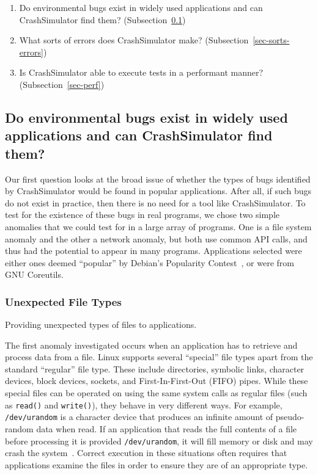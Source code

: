 \begin{enumerate}

\item{Do environmental bugs exist in widely used applications and can
      CrashSimulator find them? (Subsection~\ref{sec-env-bugs})}

\item{What sorts of errors does CrashSimulator make?
      (Subsection~\ref{sec-sorts-errors})} 

\item{Is CrashSimulator able to
      execute tests in a performant manner? (Subsection~\ref{sec-perf})}

\end{enumerate}


\subsection{Do environmental bugs  exist in widely used applications and
can CrashSimulator find them?} \label{sec-env-bugs}

Our first question looks at the broad issue of whether the types of bugs
identified by CrashSimulator would be found in popular applications.  After
all, if such bugs do not exist in practice, then there is no need for a
tool like CrashSimulator.  To test for the existence of these bugs in real
programs, we chose two simple anomalies that we could test for in a large
array of programs.  One is a file system anomaly and the other a network
anomaly, but both use common API calls, and thus had the potential to
appear in many programs.  Applications selected were either ones deemed
``popular'' by Debian's Popularity Contest~\cite{DebPopCon}, or were from
GNU Coreutils.

\subsubsection{Unexpected File Types}
\label{sec-file-type-bugs}
Providing unexpected types of files to
applications.

The first anomaly investigated occurs when an application has to retrieve
and process data from a file.  Linux supports several ``special'' file
types apart from the standard ``regular'' file type.  These include
directories, symbolic links, character devices, block devices, sockets, and
First-In-First-Out (FIFO) pipes.  While these special files can be operated
on using the same system calls as regular files (such as {\tt read()} and
{\tt write()}), they behave in very different ways.  For example, {\tt
/dev/urandom} is a character device that produces an infinite amount of
pseudo-random data when read.  If an application that reads the full
contents of a file before processing it is provided {\tt /dev/urandom}, it
will fill memory or disk and may crash the system~\cite{YumAptEndless}.
Correct execution in these situations often requires that applications
examine the files in order to ensure they are of an appropriate type.

